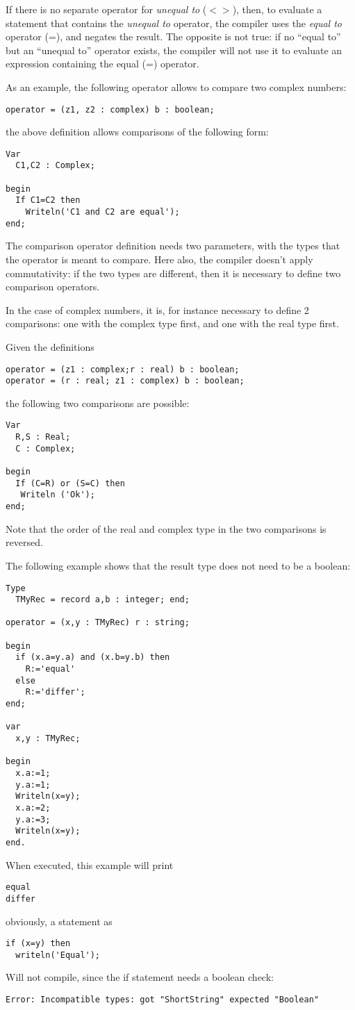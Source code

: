 If there is no separate operator for {\em unequal to} ($<>$), then, to evaluate a
statement that contains the {\em unequal to} operator, the compiler uses the
{\em equal to} operator (=), and negates the result. The opposite is not
true: if no ``equal to'' but an ``unequal to'' operator exists, the compiler
will not use it to evaluate an expression containing the equal (=) operator.

As an example, the following operator allows to compare two complex
numbers:
\begin{verbatim}
operator = (z1, z2 : complex) b : boolean;
\end{verbatim}
the above definition allows comparisons of the following form:
\begin{verbatim}
Var
  C1,C2 : Complex;

begin
  If C1=C2 then
    Writeln('C1 and C2 are equal');
end;
\end{verbatim}

The comparison operator definition needs two parameters, with the types that
the operator is meant to compare. Here also, the compiler doesn't apply
commutativity: if the two types are different, then it is necessary to
define two comparison operators.

In the case of complex numbers, it is, for instance necessary to define
2 comparisons: one with the complex type first, and one with the real type
first.

Given the definitions
\begin{verbatim}
operator = (z1 : complex;r : real) b : boolean;
operator = (r : real; z1 : complex) b : boolean;
\end{verbatim}
the following two comparisons are possible:
\begin{verbatim}
Var
  R,S : Real;
  C : Complex;

begin
  If (C=R) or (S=C) then
   Writeln ('Ok');
end;
\end{verbatim}
Note that the order of the real and complex type in the two comparisons
is reversed.

The following example shows that the result type does not need to be a boolean:
\begin{verbatim}
Type
  TMyRec = record a,b : integer; end;

operator = (x,y : TMyRec) r : string;

begin
  if (x.a=y.a) and (x.b=y.b) then
    R:='equal'
  else
    R:='differ';
end;

var
  x,y : TMyRec;

begin
  x.a:=1;
  y.a:=1;
  Writeln(x=y);
  x.a:=2;
  y.a:=3;
  Writeln(x=y);
end.
\end{verbatim}
When executed, this example will print
\begin{verbatim}
equal
differ
\end{verbatim}
obviously, a statement as
\begin{verbatim}
if (x=y) then
  writeln('Equal');
\end{verbatim}
Will not compile, since the if statement needs a boolean check:
\begin{verbatim}
Error: Incompatible types: got "ShortString" expected "Boolean"
\end{verbatim}

